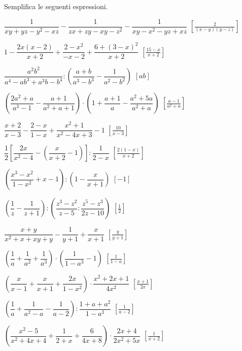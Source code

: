 \begin{esercizio}[\Ast]
\label{ese:19.38}
Semplifica le seguenti espressioni.
\begin{enumeratea}
 \item $\dfrac{1}{xy+yz-y^{2}-xz}-\dfrac{1}{zx+zy-xy-z^{2}}-
        \dfrac{1}{xy-x^{2}-yz+xz}$
  \hfill $\left[\frac{2}{(x-y)(y-z)}\right]$
 \item $1-\dfrac{2x(x-2)}{x+2}+\dfrac{2-x^{2}}{-x-2}+
        \dfrac{6+(3-x)^{2}}{x+2}$
  \hfill $\left[\frac{15-x}{x+2}\right]$
 \item $\dfrac{a^{2}b^{2}}{a^{4}-ab^{3}+a^{3}b-b^{4}}:
        \left(\dfrac{a+b}{a^{3}-b^{3}}-\dfrac{1}{a^{2}-b^{2}}\right)$
  \hfill $\left[ab\right]$
 \item $\left(\dfrac{2a^{2}+a}{a^{3}-1}-\dfrac{a+1}{a^{2}+a+1}\right)\cdot 
        \left(1+\dfrac{a+1}{a}-\dfrac{a^{2}+5a}{a^{2}+a}\right)$
  \hfill $\left[\frac{a-1}{a^{2}+a}\right]$
 \item $\dfrac{x+2}{x-3}-\dfrac{2-x}{1-x}+\dfrac{x^{2}+1}{x^{2}-4x+3}-1$
  \hfill $\left[\frac{10}{x-3}\right]$
 \item $\dfrac{1}{2}\left[\dfrac{2x}{x^{2}-4}-
        \left(\dfrac{x}{x+2}-1\right)\right]:\dfrac{1}{2-x}$
  \hfill $\left[\frac{2(1-x)}{x+2}\right]$
 \item $\left(\dfrac{x^{3}-x^{2}}{1-x^{2}}+x-1\right):
        \left(1-\dfrac{x}{x+1}\right)$
  \hfill $\left[-1\right]$
 \item $\left(\dfrac{1}{z}-\dfrac{1}{z+1}\right):
        \left(\dfrac{z^{3}-z^{2}}{z-5}:\dfrac{z^{5}-z^{3}}{2z-10}\right)$
  \hfill $\left[\frac{1}{2}\right]$
 \item $\dfrac{x+y}{x^{2}+x+xy+y}-\dfrac{1}{y+1}+\dfrac{x}{x+1}$
  \hfill $\left[\frac{y}{y+1}\right]$
 \item $\left(\dfrac{1}{a}+\dfrac{1}{a^{2}}+\dfrac{1}{a^{3}}\right)\cdot 
        \left(\dfrac{1}{1-a^{3}}-1\right)$
  \hfill $\left[\frac{1}{1-a}\right]$
 \item $\left(\dfrac{x}{x-1}+\dfrac{x}{x+1}+\dfrac{2x}{1-x^{2}}\right)\cdot 
       {\dfrac{x^{2}+2x+1}{4x^{2}}}$
  \hfill $\left[\frac{x+1}{2x}\right]$
 \item $\left(\dfrac{1}{a}+\dfrac{1}{a^{{2}}-a}-\dfrac{1}{a-2}\right):
        \dfrac{1+a+a^{2}}{1-a^{3}}$
  \hfill $\left[\frac{1}{a-2}\right]$
 \item $\left(\dfrac{x^{2}-5}{x^{2}+4x+4}+
              \dfrac{1}{2+x}+\dfrac{6}{4x+8}\right)\cdot 
       {\dfrac{2x+4}{2x^{2}+5x}}$
  \hfill $\left[\frac{1}{x+2}\right]$
\end{enumeratea}
\end{esercizio}

